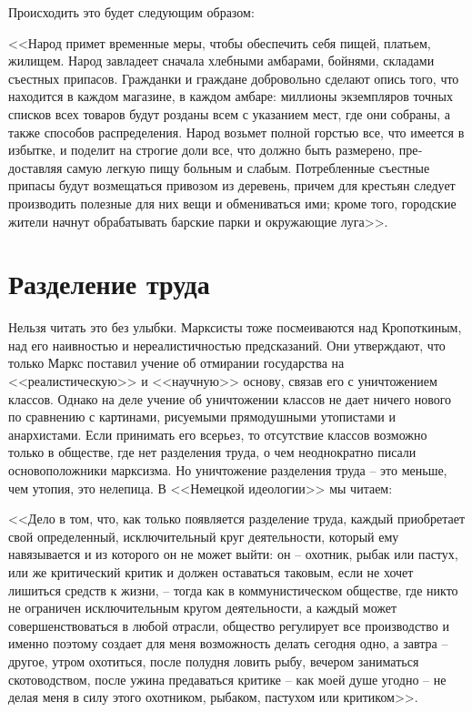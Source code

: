 \documentclass{book}
\begin{document}
Происходить это будет следующим образом:

<<Народ примет временные меры, чтобы обеспечить себя пи­щей, платьем, жилищем. Народ 
завладеет сначала хлебными ам­барами, бойнями, складами съестных припасов. Гражданки и 
граждане добровольно сделают опись того, что находится в каждом магазине, в каждом 
амбаре: миллионы экземпляров точных списков всех товаров будут розданы всем с 
указанием мест, где они собраны, а также способов распределения. На­род возьмет полной 
горстью все, что имеется в избытке, и по­делит на строгие доли все, что должно быть 
размерено, пре­доставляя самую легкую пищу больным и слабым. Потреблен­ные съестные 
припасы будут возмещаться привозом из дере­вень, причем для крестьян следует 
производить полезные для них вещи и обмениваться ими; кроме того, городские жители 
начнут обрабатывать барские парки и окружающие луга>>.


\section{Разделение труда}

Нельзя читать это без улыбки. Марксисты тоже посмеивают­ся над Кропоткиным, над его наивностью и нереалистичностью предсказаний. Они утверждают, что только Маркс поставил учение об отмирании государства на <<реалистическую>> и <<науч­ную>> основу, связав его с уничтожением классов. Однако на деле учение об уничтожении классов не дает ничего нового по сравнению с картинами, рисуемыми прямодушными утописта­ми и анархистами. Если принимать его всерьез, то отсутствие классов возможно только в обществе, где нет разделения тру­да, о чем неоднократно писали основоположники марксизма. Но уничтожение разделения труда -- это меньше, чем утопия, это нелепица. В <<Немецкой идеологии>> мы читаем:

<<Дело в том, что, как только появляется разделение труда, каждый приобретает свой определенный, исключительный круг деятельности, который ему навязывается и из которого он не может выйти: он -- охотник, рыбак или пастух, или же критический критик и должен оставаться таковым, если не хочет лишиться средств к жизни, -- тогда как в коммунисти­ческом обществе, где никто не ограничен исключительным кругом деятельности, а каждый может совершенствоваться в любой отрасли, общество регулирует все производство и именно поэтому создает для меня возможность делать сегод­ня одно, а завтра -- другое, утром охотиться, после полудня ловить рыбу, вечером заниматься скотоводством, после ужина предаваться критике -- как моей душе угодно -- не делая ме­ня в силу этого охотником, рыбаком, пастухом или крити­ком>>.%
\end{document}
